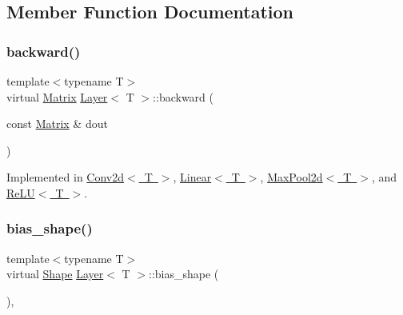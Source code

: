 \subsection{Member Function Documentation}
\mbox{\label{class_layer_ac4c13a3a85bfdd4d7d4d18669e3299fe}} 
\subsubsection{\texorpdfstring{backward()}{backward()}}
{\footnotesize\ttfamily template$<$typename T$>$ \\
virtual \mbox{\hyperlink{class_layer_a22b1e7286096aa62bd245536c8ebdaf1}{Matrix}} \mbox{\hyperlink{class_layer}{Layer}}$<$ T $>$\+::backward (\begin{DoxyParamCaption}\item[{const \mbox{\hyperlink{class_layer_a22b1e7286096aa62bd245536c8ebdaf1}{Matrix}} \&}]{dout }\end{DoxyParamCaption})\hspace{0.3cm}{\ttfamily [pure virtual]}}



Implemented in \mbox{\hyperlink{class_conv2d_ab5a54c023efbc6206b8f4aa355e5faa9}{Conv2d$<$ T $>$}}, \mbox{\hyperlink{class_linear_a747db1996e723fae7c9713d4b7f303af}{Linear$<$ T $>$}}, \mbox{\hyperlink{class_max_pool2d_a05cc96411753ff4c0c79a1543af9e795}{Max\+Pool2d$<$ T $>$}}, and \mbox{\hyperlink{class_re_l_u_aa634f43909614b979d84f5d4e5480bb4}{Re\+L\+U$<$ T $>$}}.

\mbox{\label{class_layer_ad557254136784e9312ebb197b2bd3faf}} 
\subsubsection{\texorpdfstring{bias\_shape()}{bias\_shape()}}
{\footnotesize\ttfamily template$<$typename T$>$ \\
virtual \mbox{\hyperlink{class_layer_a8313f42d2292d12dd5d40cc115636693}{Shape}} \mbox{\hyperlink{class_layer}{Layer}}$<$ T $>$\+::bias\+\_\+shape (\begin{DoxyParamCaption}{ }\end{DoxyParamCaption})\hspace{0.3cm}{\ttfamily [inline]}, {\ttfamily [virtual]}}

